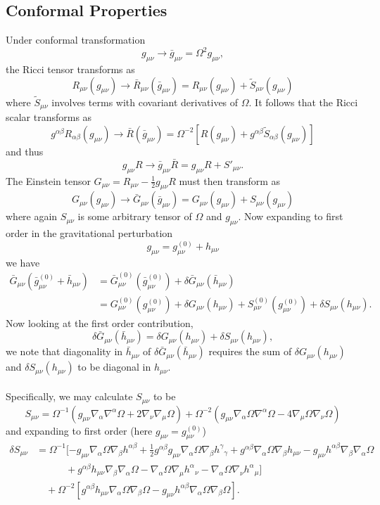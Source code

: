 \documentclass[10pt,letterpaper]{article}
\newcommand{\be}{\begin{equation}} %
\newcommand{\ee}{\end{equation}} %
\newcommand{\del}{\nabla} %
\numberwithin{equation}{section}
\begin{document}
\subsection{Conformal Properties}
 Under conformal transformation
\be
	g_{\mu\nu} \to \bar g_{\mu\nu}=\Omega^2 g_{\mu\nu} ,
\ee
the Ricci  tensor  transforms as
\be
	R_{\mu\nu}(g_{\mu\nu})\to \bar R_{\mu\nu}(\bar g_{\mu\nu})= R_{\mu\nu}(g_{\mu\nu}) +\tilde S_{\mu\nu}(g_{\mu\nu}) 
\ee
where $\tilde S_{\mu\nu}$ involves terms with covariant derivatives of $\Omega$. It follows that the Ricci scalar transforms as
\be
	g^{\alpha\beta}R_{\alpha\beta}(g_{\mu\nu})\to \bar R(\bar g_{\mu\nu})=\Omega^{-2}[R(g_{\mu\nu})  +g^{\alpha\beta}\tilde S_{\alpha\beta}(g_{\mu\nu})] 
\ee
and thus
\be
	g_{\mu\nu}R \to \bar g_{\mu\nu}\bar R= g_{\mu\nu}R + S'_{\mu\nu}.
\ee
The Einstein tensor $G_{\mu\nu} = R_{\mu\nu} - \frac12 g_{\mu\nu}R$ must then transform as
\be
	G_{\mu\nu}(g_{\mu\nu}) \to \bar G_{\mu\nu}(\bar g_{\mu\nu}) =G_{\mu\nu}(g_{\mu\nu})+ S_{\mu\nu}(g_{\mu\nu})
\ee
where again $S_{\mu\nu}$ is some arbitrary tensor of $\Omega$ and $g_{\mu\nu}$. Now expanding to first order in the gravitational
perturbation
\be
	g_{\mu\nu} = g^{(0)}_{\mu\nu} + h_{\mu\nu}
\ee
we have 
\begin{align}
	\bar G_{\mu\nu}(\bar g^{(0)}_{\mu\nu}+ \bar h_{\mu\nu}) &= \bar G_{\mu\nu}^{(0)}(\bar g^{(0)}_{\mu\nu}) + \delta \bar G_{\mu\nu}(\bar h_{\mu\nu})\\
	&=G^{(0)}_{\mu\nu}(g^{(0)}_{\mu\nu})+ \delta G_{\mu\nu}(h_{\mu\nu}) + S^{(0)}_{\mu\nu}(g^{(0)}_{\mu\nu}) + \delta S_{\mu\nu}(h_{\mu\nu}). \nonumber
\end{align}
Now looking at the first order contribution,
\be
	 \delta \bar G_{\mu\nu}(\bar h_{\mu\nu}) =  \delta G_{\mu\nu}(h_{\mu\nu}) + \delta S_{\mu\nu}(h_{\mu\nu}),
\ee
we note that diagonality in $\bar h_{\mu\nu}$ of  $\delta \bar G_{\mu\nu}(\bar h_{\mu\nu})$ requires the sum of $ \delta G_{\mu\nu}(h_{\mu\nu})$ and $\delta S_{\mu\nu}(h_{\mu\nu})$ to be diagonal in $h_{\mu\nu}$. 
\\ \\
Specifically, we may calculate $S_{\mu\nu}$ to be
\be
	S_{\mu\nu} = \Omega^{-1}( g_{\mu\nu} \del_\alpha \del^\alpha \Omega + 2\del_\nu\del_\mu \Omega) + \Omega^{-2}( g_{\mu\nu}\del_\alpha \Omega \del^\alpha\Omega - 4\del_\mu\Omega \del_\nu\Omega)
\ee
and expanding to first order (here $g_{\mu\nu} = g^{(0)}_{\mu\nu}$)
\begin{align}
	\delta S_{\mu\nu} &= \Omega^{-1}[-g_{\mu\nu}\del_\alpha\Omega\del_\beta h^{\alpha\beta}+\frac12 g^{\alpha\beta}g_{\mu\nu}\del_\alpha\Omega \del_\beta
h^\gamma{}_\gamma+g^{\alpha\beta}\del_\alpha\Omega \del_\beta h_{\mu\nu}-g_{\mu\nu}h^{\alpha\beta}\del_\beta\del_\alpha \Omega\\
&\qquad\quad 
+g^{\alpha\beta}h_{\mu\nu}\del_\beta\del_\alpha \Omega - \del_\alpha \Omega \del_\mu h^\alpha{}_\nu - \del_\alpha \Omega\del_\nu h^{\alpha}{}_\mu]\nonumber \\
&\quad + \Omega^{-2}[ g^{\alpha\beta}h_{\mu\nu} \del_\alpha\Omega \del_\beta\Omega - g_{\mu\nu} h^{\alpha\beta}\del_\alpha\Omega \del_\beta\Omega]. \nonumber
\end{align}
\end{document}
